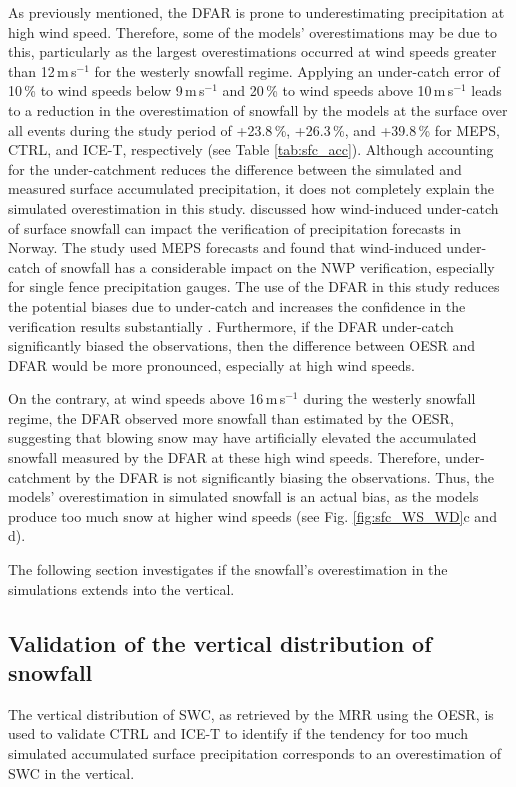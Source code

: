 \documentclass{ametsocV5}
\begin{document}
		As previously mentioned, the DFAR is prone to underestimating precipitation at high wind speed. Therefore, some of the models' overestimations may be due to this, particularly as the largest overestimations occurred at wind speeds greater than 12\,m\,s$^{-1}$ for the westerly snowfall regime. Applying an under-catch error of 10\,\% to wind speeds below 9\,m\,s$^{-1}$ and 20\,\% to wind speeds above 10\,m\,s$^{-1}$ leads to a reduction in the overestimation of snowfall by the models at the surface over all events during the study period of +23.8\,\%, +26.3\,\%, and +39.8\,\% for MEPS, CTRL, and ICE-T, respectively (see Table \ref{tab:sfc_acc}). Although accounting for the under-catchment reduces the difference between the simulated and measured surface accumulated precipitation, it does not completely explain the simulated overestimation in this study. \citet{koltzow_verification_2020} discussed how wind-induced under-catch of surface snowfall can impact the verification of precipitation forecasts in Norway. The study used MEPS forecasts and found that wind-induced under-catch of snowfall has a considerable impact on the NWP verification, especially for single fence precipitation gauges. The use of the DFAR in this study reduces the potential biases due to under-catch and increases the confidence in the verification results substantially \citep{koltzow_verification_2020}. Furthermore, if the DFAR under-catch significantly biased the observations, then the difference between OESR and DFAR would be more pronounced, especially at high wind speeds. 
		
		On the contrary, at wind speeds above 16\,m\,s$^{-1}$ during the westerly snowfall regime, the DFAR observed more snowfall than estimated by the OESR, suggesting that blowing snow may have artificially elevated the accumulated snowfall measured by the DFAR at these high wind speeds. Therefore, under-catchment by the DFAR is not significantly biasing the observations. Thus, the models' overestimation in simulated snowfall is an actual bias, as the models produce too much snow at higher wind speeds (see Fig. \ref{fig:sfc_WS_WD}c and d).

		The following section investigates if the snowfall's overestimation in the simulations extends into the vertical.
				

	\subsection{Validation of the vertical distribution of snowfall}\label{sec:res:swc}
		The vertical distribution of SWC, as retrieved by the MRR using the OESR, is used to validate CTRL and ICE-T to identify if the tendency for too much simulated accumulated surface precipitation corresponds to an overestimation of SWC in the vertical.
\end{document}
